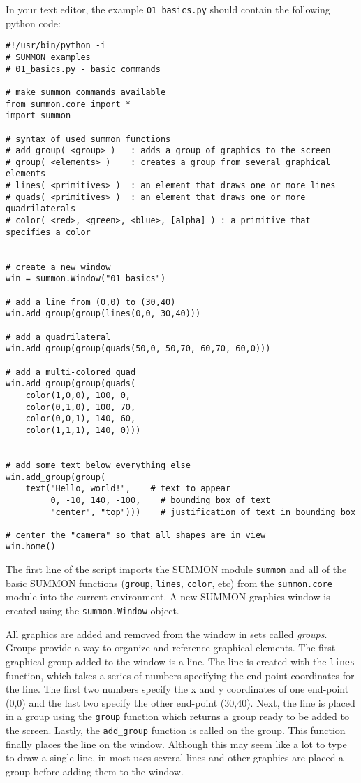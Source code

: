 \documentclass[12pt]{article}
\newcommand{\code}[1]{{\tt #1}}
\begin{document}
In your text editor, the example \code{01\_basics.py} should contain the 
following python code:

\begin{minipage}{6in}
{ \footnotesize
\begin{verbatim}
#!/usr/bin/python -i
# SUMMON examples
# 01_basics.py - basic commands

# make summon commands available
from summon.core import *
import summon

# syntax of used summon functions
# add_group( <group> )   : adds a group of graphics to the screen
# group( <elements> )    : creates a group from several graphical elements
# lines( <primitives> )  : an element that draws one or more lines
# quads( <primitives> )  : an element that draws one or more quadrilaterals
# color( <red>, <green>, <blue>, [alpha] ) : a primitive that specifies a color


# create a new window
win = summon.Window("01_basics")

# add a line from (0,0) to (30,40)
win.add_group(group(lines(0,0, 30,40)))

# add a quadrilateral
win.add_group(group(quads(50,0, 50,70, 60,70, 60,0)))

# add a multi-colored quad
win.add_group(group(quads(
    color(1,0,0), 100, 0,
    color(0,1,0), 100, 70,
    color(0,0,1), 140, 60,
    color(1,1,1), 140, 0)))


# add some text below everything else
win.add_group(group(
    text("Hello, world!",    # text to appear
         0, -10, 140, -100,    # bounding box of text
         "center", "top")))    # justification of text in bounding box

# center the "camera" so that all shapes are in view
win.home()

\end{verbatim}
}
\end{minipage}
\vspace{.25in}


The first line of the script imports the SUMMON module \code{summon} and all of 
the basic SUMMON functions (\code{group}, \code{lines}, \code{color}, etc) from
the \code{summon.core} module into the current environment.  
A new SUMMON graphics window is created using the \code{summon.Window} object.

All graphics are added and removed from the window in sets called {\em groups}. 
Groups provide a way to organize and reference graphical elements.
The first graphical group added to the window is a line.
The line is created with the \code{lines} function, which takes a series of
numbers specifying the end-point coordinates for the line.  The first
two numbers specify the x and y coordinates of one end-point (0,0) and the last
two specify the other end-point (30,40).  Next, the line is placed in a group
using the \code{group} function which returns a group ready to be added to the
screen.   Lastly, the \code{add\_group} function is called on the group.  This
function finally places the line on the window.  Although this may seem like a
lot to type to draw a single line, in most uses several lines and other graphics 
are placed a group before adding them to the window.
\end{document}
